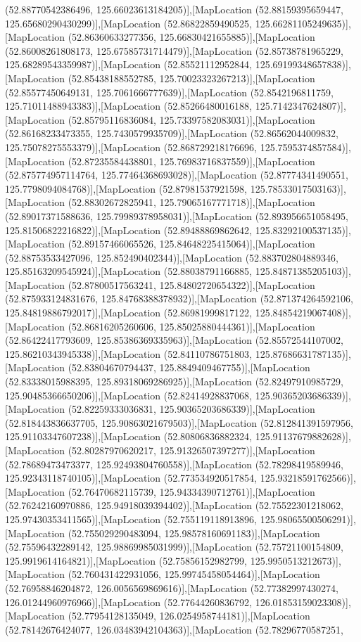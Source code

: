 (52.88770542386496, 125.66023613184205)],[MapLocation (52.88159395659447, 125.65680290430299)],[MapLocation (52.86822859490525, 125.66281105249635)],[MapLocation (52.86360633277356, 125.66830421655885)],[MapLocation (52.86008261808173, 125.67585731714479)],[MapLocation (52.85738781965229, 125.68289543359987)],[MapLocation (52.85521112952844, 125.69199348657838)],[MapLocation (52.85438188552785, 125.70023323267213)],[MapLocation (52.85577450649131, 125.7061666777639)],[MapLocation (52.8542196811759, 125.71011488943383)],[MapLocation (52.85266480016188, 125.7142347624807)],[MapLocation (52.85795116836084, 125.73397582083031)],[MapLocation (52.86168233473355, 125.7430579935709)],[MapLocation (52.86562044009832, 125.75078275553379)],[MapLocation (52.868729218176696, 125.7595374857584)],[MapLocation (52.87235584438801, 125.76983716837559)],[MapLocation (52.875774957114764, 125.77464368693028)],[MapLocation (52.87774341490551, 125.7798094084768)],[MapLocation (52.87981537921598, 125.78533017503163)],[MapLocation (52.88302672825941, 125.79065167771718)],[MapLocation (52.89017371588636, 125.79989378958031)],[MapLocation (52.893956651058495, 125.81506822216822)],[MapLocation (52.89488869862642, 125.83292100537135)],[MapLocation (52.89157466065526, 125.84648225415064)],[MapLocation (52.88753533427096, 125.852490402344)],[MapLocation (52.883702804889346, 125.85163209545924)],[MapLocation (52.88038791166885, 125.84871385205103)],[MapLocation (52.87800517563241, 125.84802720654322)],[MapLocation (52.875933124831676, 125.84768388378932)],[MapLocation (52.871374264592106, 125.84819886792017)],[MapLocation (52.86981999817122, 125.84854219067408)],[MapLocation (52.86816205260606, 125.85025880444361)],[MapLocation (52.86422417793609, 125.85386369335963)],[MapLocation (52.85572544107002, 125.86210343945338)],[MapLocation (52.84110786751803, 125.87686631787135)],[MapLocation (52.83804670794437, 125.8849409467755)],[MapLocation (52.83338015988395, 125.89318069286925)],[MapLocation (52.82497910985729, 125.90485366650206)],[MapLocation (52.82414928837068, 125.90365203686339)],[MapLocation (52.82259333036831, 125.90365203686339)],[MapLocation (52.818443836637705, 125.90863021679503)],[MapLocation (52.812841391597956, 125.91103347607238)],[MapLocation (52.80806836882324, 125.91137679882628)],[MapLocation (52.80287970620217, 125.91326507397277)],[MapLocation (52.78689473473377, 125.92493804760558)],[MapLocation (52.78298419589946, 125.92343118740105)],[MapLocation (52.773534920517854, 125.93218591762566)],[MapLocation (52.76470682115739, 125.94334390712761)],[MapLocation (52.76242160970886, 125.94918039394402)],[MapLocation (52.75522301218062, 125.97430353411565)],[MapLocation (52.755119118913896, 125.98065500506291)],[MapLocation (52.755029290483094, 125.98578160691183)],[MapLocation (52.75596432289142, 125.98869985031999)],[MapLocation (52.75721100154809, 125.9919614164821)],[MapLocation (52.75856152982799, 125.9950513212673)],[MapLocation (52.760431422931056, 125.99745458054464)],[MapLocation (52.76958846204872, 126.0056569869616)],[MapLocation (52.77382997430274, 126.01244960976966)],[MapLocation (52.77644260836792, 126.01853159023308)],[MapLocation (52.77954128135049, 126.0254958744181)],[MapLocation (52.78142676424077, 126.03483942104363)],[MapLocation (52.78296770587251, 
